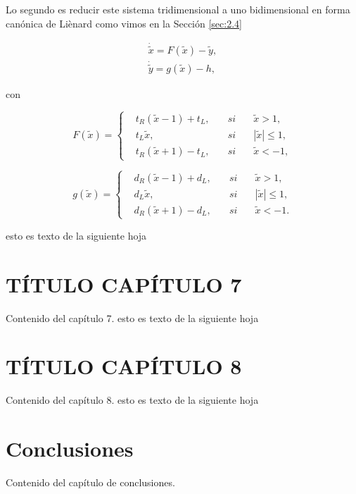 \documentclass[12pt,a4paper]{report} %
\begin{document}
	
	\newpage
	
	\vspace{0.5cm}Lo segundo es reducir este sistema tridimensional a uno bidimensional en forma canónica de Liènard como vimos en la Sección \ref{sec:2.4}
	
	\begin{equation}
		\tag{2.42}
		\begin{gathered}
			\dot{\tilde{x}}=F(\tilde{x})-\tilde{y}, \\[2mm]
			\dot{\tilde{y}}=g(\tilde{x})-h,
		\end{gathered}
	\end{equation}
	
	con
	
	\begin{equation}
		\tag{2.43}
		F(\tilde{x})=
		\left\{
		\begin{aligned}
			&t_R(\tilde{x}-1)+t_L, \quad &si& \quad \tilde{x}>1,\\
			&t_L\tilde{x}, &si& \quad |\tilde{x}|\leq 1,\\
			&t_R(\tilde{x}+1)-t_L, \quad &si& \quad \tilde{x}<-1,
		\end{aligned}
		\right.
	\end{equation}\smallskip
	
	\begin{equation}
		\tag{2.44}
		g(\tilde{x})=
		\left\{
		\begin{aligned}
			&d_R(\tilde{x}-1)+d_L, \quad &si& \quad \tilde{x}>1,\\
			&d_L\tilde{x}, &si& \quad |\tilde{x}|\leq 1,\\
			&d_R(\tilde{x}+1)-d_L, \quad &si& \quad \tilde{x}<-1.
		\end{aligned}
		\right.
	\end{equation}\smallskip
	
	\newpage
	esto es texto de la siguiente hoja
	
	\chapter{TÍTULO CAPÍTULO 7}
	Contenido del capítulo 7.
	\newpage
	esto es texto de la siguiente hoja
	
	\chapter{TÍTULO CAPÍTULO 8}
	Contenido del capítulo 8.
	\newpage
	esto es texto de la siguiente hoja
	
	\chapter*{Conclusiones}
	Contenido del capítulo de conclusiones.
	\newpage
	
\end{document}
